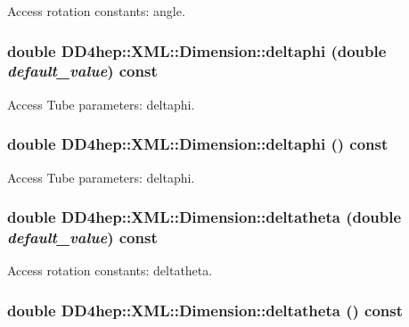 Access rotation constants: angle. \hypertarget{struct_d_d4hep_1_1_x_m_l_1_1_dimension_a1c022c3cee7cedefaf27a7bf162c58fe}{
\subsubsection[{deltaphi}]{\setlength{\rightskip}{0pt plus 5cm}double DD4hep::XML::Dimension::deltaphi (double {\em default\_\-value}) const}}
\label{struct_d_d4hep_1_1_x_m_l_1_1_dimension_a1c022c3cee7cedefaf27a7bf162c58fe}


Access Tube parameters: deltaphi. \hypertarget{struct_d_d4hep_1_1_x_m_l_1_1_dimension_a1fa642edcace2c3994e29bd965c893bc}{
\subsubsection[{deltaphi}]{\setlength{\rightskip}{0pt plus 5cm}double DD4hep::XML::Dimension::deltaphi () const}}
\label{struct_d_d4hep_1_1_x_m_l_1_1_dimension_a1fa642edcace2c3994e29bd965c893bc}


Access Tube parameters: deltaphi. \hypertarget{struct_d_d4hep_1_1_x_m_l_1_1_dimension_ae67e203f11e58ff9e7a0d8e051914fbe}{
\subsubsection[{deltatheta}]{\setlength{\rightskip}{0pt plus 5cm}double DD4hep::XML::Dimension::deltatheta (double {\em default\_\-value}) const}}
\label{struct_d_d4hep_1_1_x_m_l_1_1_dimension_ae67e203f11e58ff9e7a0d8e051914fbe}


Access rotation constants: deltatheta. \hypertarget{struct_d_d4hep_1_1_x_m_l_1_1_dimension_a0f96892cc9cbfe14514df0d7a5239210}{
\subsubsection[{deltatheta}]{\setlength{\rightskip}{0pt plus 5cm}double DD4hep::XML::Dimension::deltatheta () const}}
\label{struct_d_d4hep_1_1_x_m_l_1_1_dimension_a0f96892cc9cbfe14514df0d7a5239210}


